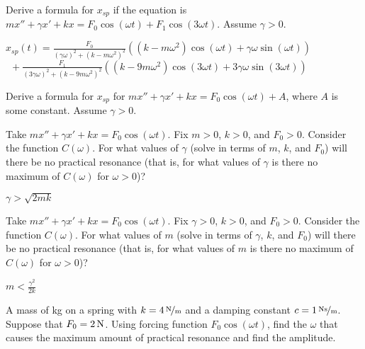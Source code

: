 \begin{exercise}
Derive a formula for $x_{sp}$ if the equation is
$m x'' + \gamma x' + kx = F_0 \cos (\omega t) + F_1 \cos (3\omega t)$.
Assume $\gamma > 0$.
\end{exercise}
\comboSol{%
}
{%
$x_{sp}(t) = \frac{F_0}{(\gamma \omega)^2 + (k - m\omega^2)^2}\left( (k - m\omega^2)\cos(\omega t) + \gamma \omega \sin(\omega t)\right)$ \\ $\ \ + \frac{F_1}{(3\gamma \omega)^2 + (k - 9m\omega^2)^2}\left( (k -9 m\omega^2)\cos(3\omega t) + 3\gamma \omega \sin(3\omega t)\right)$
}

\begin{exercise}\ansMark%
Derive a formula for $x_{sp}$ for
$mx''+\gamma x'+kx = F_0 \cos(\omega t) + A$,
where $A$ is some constant.  Assume $\gamma > 0$.
\end{exercise}

\begin{exercise}
Take $m x'' + \gamma x' + kx = F_0 \cos (\omega t)$.
Fix $m > 0$, $k > 0$, and $F_0 > 0$.  Consider the function $C(\omega)$.
For what values of $\gamma$ (solve in terms of $m$, $k$, and $F_0$) will there be no
practical resonance (that is, for what values of $\gamma$ is there no maximum of
$C(\omega)$ for $\omega > 0$)?
\end{exercise}
\comboSol{%
}
{%
$\gamma > \sqrt{2mk}$
}

\begin{exercise}
Take $m x'' + \gamma x' + kx = F_0 \cos (\omega t)$.
Fix $\gamma > 0$, $k > 0$, and $F_0 > 0$.  Consider the function $C(\omega)$.
For what values of $m$ (solve in terms of $\gamma$, $k$, and $F_0$) will there be no
practical resonance (that is, for what values of $m$ is there no maximum of
$C(\omega)$ for $\omega > 0$)?
\end{exercise}
\comboSol{%
}
{%
$m < \frac{\gamma^2}{2k}$
}

\begin{exercise}\ansMark%
A mass of \unit[4]{kg} on a spring with $k=\unitfrac[4]{N}{m}$ and a damping
constant $c=\unitfrac[1]{Ns}{m}$.
Suppose that $F_0 = \unit[2]{N}$.  Using forcing function $F_0 \cos (\omega t)$,
find the $\omega$ that causes the maximum amount of practical resonance and find the amplitude.
\end{exercise}

